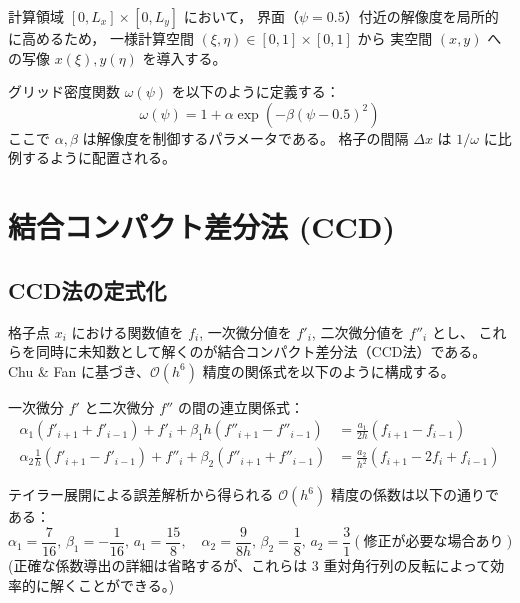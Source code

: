 \documentclass[12pt, a4paper, titlepage, xelatex, ja=standard]{bxjsarticle}
\newcommand{\Ord}[1]{\mathcal{O}(#1)}
\begin{document}
計算領域 $[0, L_x]\times[0, L_y]$ において，
界面（$\psi=0.5$）付近の解像度を局所的に高めるため，
一様計算空間 $(\xi, \eta) \in [0, 1]\times[0, 1]$ から
実空間 $(x, y)$ への写像 $x(\xi), y(\eta)$ を導入する。

グリッド密度関数 $\omega(\psi)$ を以下のように定義する：
\begin{equation}
  \omega(\psi) = 1 + \alpha \exp\left( - \beta (\psi - 0.5)^2 \right)
\end{equation}
ここで $\alpha, \beta$ は解像度を制御するパラメータである。
格子の間隔 $\Delta x$ は $1/\omega$ に比例するように配置される。


\section{結合コンパクト差分法 (CCD)}
\label{sec:CCD}

\subsection{CCD法の定式化}

格子点 $x_i$ における関数値を $f_i$, 一次微分値を $f'_i$, 二次微分値を $f''_i$ とし、
これらを同時に未知数として解くのが結合コンパクト差分法（CCD法）である。
Chu \& Fan \cite{ChuFan1998} に基づき、$\Ord{h^6}$ 精度の関係式を以下のように構成する。

\begin{tcolorbox}[algbox, title={CCD $\Ord{h^6}$ 差分式}]
一次微分 $f'$ と二次微分 $f''$ の間の連立関係式：
\begin{align}
  \alpha_1 (f'_{i+1} + f'_{i-1}) + f'_i + \beta_1 h (f''_{i+1} - f''_{i-1}) &= \frac{a_1}{2h} (f_{i+1} - f_{i-1}) \label{eq:ccd1} \\
  \alpha_2 \frac{1}{h} (f'_{i+1} - f'_{i-1}) + f''_i + \beta_2 (f''_{i+1} + f''_{i-1}) &= \frac{a_2}{h^2} (f_{i+1} - 2f_i + f_{i-1}) \label{eq:ccd2}
\end{align}
\end{tcolorbox}

テイラー展開による誤差解析から得られる $\Ord{h^6}$ 精度の係数は以下の通りである：
\begin{equation}
  \alpha_1 = \frac{7}{16},\, \beta_1 = -\frac{1}{16},\, a_1 = \frac{15}{8},\quad
  \alpha_2 = \frac{9}{8h},\, \beta_2 = \frac{1}{8},\, a_2 = \frac{3}{1} (\text{修正が必要な場合あり})
\end{equation}
(正確な係数導出の詳細は省略するが、これらは 3 重対角行列の反転によって効率的に解くことができる。)
\end{document}
